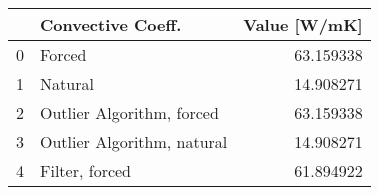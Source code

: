 \begin{tabular}{llr}
\toprule
{} &           Convective Coeff. &  Value [W/mK] \\
\midrule
0 &                      Forced &     63.159338 \\
1 &                     Natural &     14.908271 \\
2 &   Outlier Algorithm, forced &     63.159338 \\
3 &  Outlier Algorithm, natural &     14.908271 \\
4 &              Filter, forced &     61.894922 \\
\bottomrule
\end{tabular}
